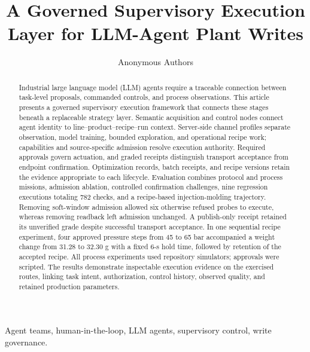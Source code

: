 \documentclass[journal]{IEEEtran}
\begin{document}

\title{A Governed Supervisory Execution Layer for LLM-Agent Plant Writes}

\author{Anonymous Authors}

\maketitle

\begin{abstract}
Industrial large language model (LLM) agents require a traceable connection
between task-level proposals, commanded controls, and process observations.
This article presents a governed supervisory execution framework that
connects these stages beneath a replaceable strategy layer. Semantic
acquisition and control nodes connect agent identity to
line--product--recipe--run context. Server-side channel profiles separate
observation, model training, bounded exploration, and operational recipe
work; capabilities and source-specific admission resolve execution
authority. Required approvals govern actuation, and graded receipts
distinguish transport acceptance from endpoint confirmation. Optimization
records, batch receipts, and recipe versions retain the evidence appropriate
to each lifecycle. Evaluation combines protocol and process missions,
admission ablation, controlled confirmation challenges, nine regression
executions totaling 782 checks, and a recipe-based injection-molding
trajectory. Removing soft-window admission allowed six otherwise refused
probes to execute, whereas removing readback left admission unchanged.
A publish-only receipt retained its unverified grade despite successful
transport acceptance. In one sequential recipe experiment, four approved
pressure steps from 45 to 65 bar accompanied a weight change from
31.28 to 32.30 g with a fixed 6-s hold time, followed by retention of the
accepted recipe. All process experiments used repository simulators;
approvals were scripted. The results demonstrate inspectable execution
evidence on the exercised routes, linking task intent, authorization,
control history, observed quality, and retained production parameters.
\end{abstract}

\begin{IEEEkeywords}
Agent teams, human-in-the-loop, LLM agents, supervisory control, write
governance.
\end{IEEEkeywords}

\IEEEpeerreviewmaketitle





\FloatBarrier





\end{document}
